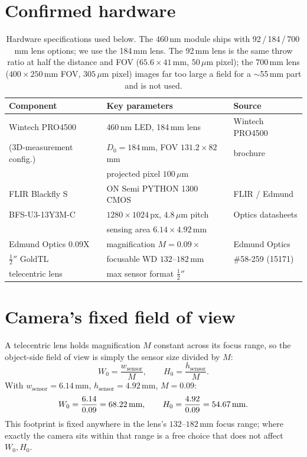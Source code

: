 \documentclass[11pt]{article}
\begin{document}
\section{Confirmed hardware}

\begin{table}[h]
\centering
\begin{tabular}{@{}lll@{}}
\toprule
Component & Key parameters & Source \\
\midrule
Wintech PRO4500 & 460\,nm LED, 184\,mm lens & Wintech PRO4500 \\
(3D-measurement config.) & $D_0 = 184$\,mm, FOV $131.2\times82$\,mm & brochure \\
 & projected pixel $100\,\mu$m & \\[2pt]
FLIR Blackfly S & ON Semi PYTHON 1300 CMOS & FLIR / Edmund \\
BFS-U3-13Y3M-C & $1280\times1024$\,px, $4.8\,\mu$m pitch & Optics datasheets \\
 & sensing area $6.14\times4.92$\,mm & \\[2pt]
Edmund Optics 0.09X & magnification $M=0.09\times$ & Edmund Optics \\
$\tfrac{1}{2}''$ GoldTL & focusable WD $132$--$182$\,mm & \#58-259 (15171) \\
telecentric lens & max sensor format $\tfrac{1}{2}''$ & \\
\bottomrule
\end{tabular}
\caption{Hardware specifications used below. The 460\,nm module ships with
92\,/\,184\,/\,700\,mm lens options; we use the 184\,mm lens. The 92\,mm lens
is the same throw ratio at half the distance and FOV ($65.6{\times}41$\,mm,
$50\,\mu$m pixel); the 700\,mm lens ($400{\times}250$\,mm FOV, $305\,\mu$m
pixel) images far too large a field for a $\sim$55\,mm part and is not used.}
\end{table}

\section{Camera's fixed field of view}
\label{sec:camera-fov}

A telecentric lens holds magnification $M$ constant across its focus
range, so the object-side field of view is simply the sensor size divided
by $M$:
\begin{equation}
  W_0 = \frac{w_{\text{sensor}}}{M}, \qquad
  H_0 = \frac{h_{\text{sensor}}}{M}.
\end{equation}
With $w_{\text{sensor}} = 6.14$\,mm, $h_{\text{sensor}} = 4.92$\,mm,
$M = 0.09$:
\begin{equation}
  W_0 = \frac{6.14}{0.09} = 68.22\text{\,mm}, \qquad
  H_0 = \frac{4.92}{0.09} = 54.67\text{\,mm}.
\end{equation}
This footprint is fixed anywhere in the lens's $132$--$182$\,mm focus
range; where exactly the camera sits within that range is a free choice
that does not affect $W_0, H_0$.
\end{document}
